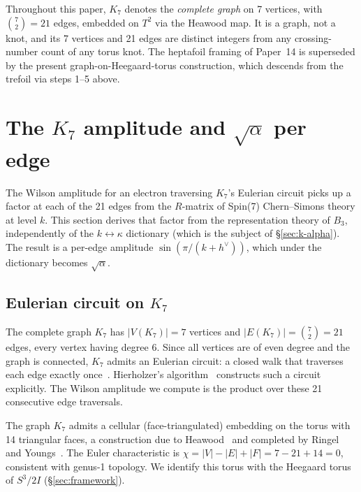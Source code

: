\documentclass[11pt]{article}
\newcommand{\hv}{h^{\vee}}
\begin{document}
Throughout this paper, $K_7$ denotes the \emph{complete graph}
on 7 vertices, with $\binom{7}{2} = 21$ edges, embedded on $T^2$
via the Heawood map.  It is a graph, not a knot, and its 7
vertices and 21 edges are distinct integers from any
crossing-number count of any torus knot.  The heptafoil framing
of Paper~14 is superseded by the present graph-on-Heegaard-torus
construction, which descends from the trefoil via steps 1--5 above.

\section{The $K_7$ amplitude and $\sqrt{\alpha}$ per edge}
\label{sec:k7-amp}

The Wilson amplitude for an electron traversing
$K_7$'s Eulerian circuit picks up a factor at each of the 21 edges
from the $R$-matrix of Spin(7) Chern--Simons theory at level $k$.
This section derives that factor from the representation theory
of $B_3$, independently of the $k \leftrightarrow \kappa$
dictionary (which is the subject of \S\ref{sec:k-alpha}).  The
result is a per-edge amplitude $\sin(\pi/(k + \hv))$, which under
the dictionary becomes $\sqrt{\alpha}$.

\subsection{Eulerian circuit on $K_7$}
\label{sec:k7-eulerian}

The complete graph $K_7$ has $|V(K_7)| = 7$ vertices and
$|E(K_7)| = \binom{7}{2} = 21$ edges, every vertex having
degree $6$.  Since all vertices are of even degree and the graph
is connected, $K_7$ admits an Eulerian circuit: a closed walk
that traverses each edge exactly once~\cite{euler1736}.
Hierholzer's algorithm~\cite{hierholzer1873} constructs such a
circuit explicitly.  The Wilson amplitude we compute is the
product over these 21 consecutive edge traversals.

The graph $K_7$ admits a cellular (face-triangulated) embedding
on the torus with 14 triangular faces, a construction due to
Heawood~\cite{heawood1890} and completed by
Ringel and Youngs~\cite{ringel-youngs}.  The Euler
characteristic is
$\chi = |V| - |E| + |F| = 7 - 21 + 14 = 0$, consistent with
genus-1 topology.  We identify this torus with the Heegaard
torus of $S^3/2I$ (\S\ref{sec:framework}).
\end{document}
